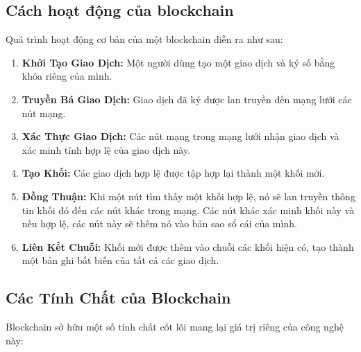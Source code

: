 \subsection{Cách hoạt động của blockchain}
Quá trình hoạt động cơ bản của một blockchain diễn ra như sau:
\begin{enumerate}
    \item \textbf{Khởi Tạo Giao Dịch:} Một người dùng tạo một giao dịch và ký số bằng khóa riêng của mình.

    \item \textbf{Truyền Bá Giao Dịch:} Giao dịch đã ký được lan truyền đến mạng lưới các nút mạng.

    \item \textbf{Xác Thực Giao Dịch:} Các nút mạng trong mạng lưới nhận giao dịch và xác minh tính hợp lệ của giao dịch này.

    \item \textbf{Tạo Khối:} Các giao dịch hợp lệ được tập hợp lại thành một khối mới.

    \item \textbf{Đồng Thuận:} Khi một nút tìm thấy một khối hợp lệ, nó sẽ lan truyền thông tin khối đó đến các nút khác trong mạng. Các nút khác xác minh khối này và nếu hợp lệ, các nút này sẽ thêm nó vào bản sao sổ cái của mình.

    \item \textbf{Liên Kết Chuỗi:} Khối mới được thêm vào chuỗi các khối hiện có, tạo thành một bản ghi bất biến của tất cả các giao dịch.
\end{enumerate}
\subsection{Các Tính Chất của Blockchain}

Blockchain sở hữu một số tính chất cốt lõi mang lại giá trị riêng của công nghệ này:

